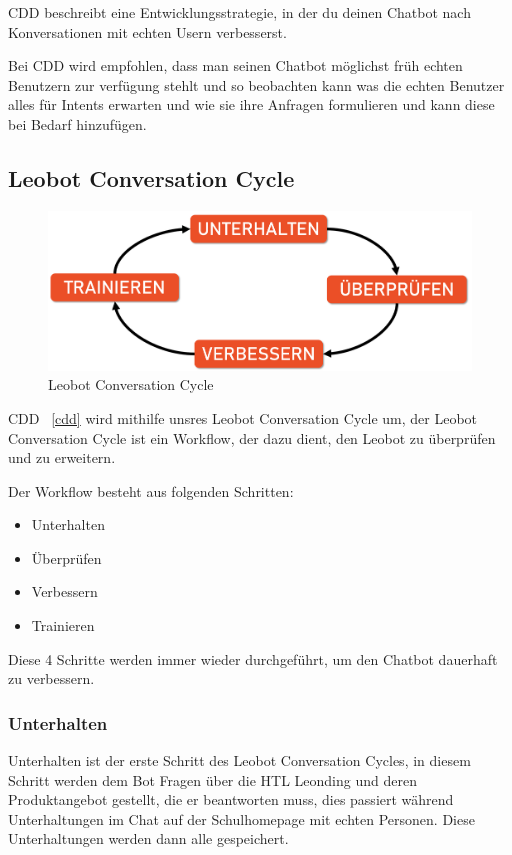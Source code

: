 CDD beschreibt eine Entwicklungsstrategie, in der du deinen Chatbot nach Konversationen mit echten Usern verbesserst.

Bei CDD wird empfohlen, dass man seinen Chatbot möglichst früh echten Benutzern zur verfügung stehlt und so beobachten kann was die echten Benutzer alles für Intents erwarten und wie sie ihre Anfragen formulieren und kann diese bei Bedarf hinzufügen.



\subsection{Leobot Conversation Cycle}

\begin{figure}[hbt!]
    \centering
    \includegraphics[scale=0.2]{pics/LeoCircle}
    \caption{Leobot Conversation Cycle}
    \label{fig:impl:ConversationCycle}
\end{figure}

CDD ~\ref{cdd} wird mithilfe unsres Leobot Conversation Cycle um, der Leobot Conversation Cycle ist ein Workflow, der dazu dient, den Leobot zu überprüfen und zu erweitern.

Der Workflow besteht aus folgenden Schritten:

\begin{itemize}
    \item Unterhalten
    \item Überprüfen
    \item Verbessern
    \item Trainieren
\end{itemize}

Diese 4 Schritte werden immer wieder durchgeführt, um den Chatbot dauerhaft zu verbessern.

\subsubsection{Unterhalten}
Unterhalten ist der erste Schritt des Leobot Conversation Cycles, in diesem Schritt werden dem Bot Fragen über die HTL Leonding und deren Produktangebot gestellt, die er beantworten muss, dies passiert während Unterhaltungen im Chat auf der Schulhomepage mit echten Personen.
Diese Unterhaltungen werden dann alle gespeichert.

